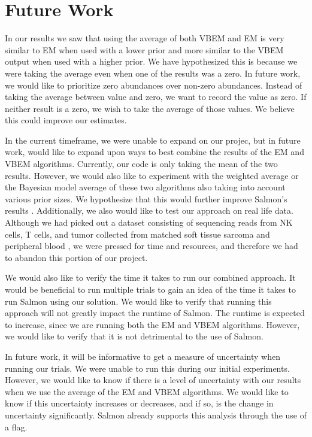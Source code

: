 \section{Future Work}
In our results we saw that using the average of both VBEM and EM is very similar to EM 
when used with a lower prior and more similar to the VBEM output when used with a higher prior. 
We have hypothesized this is because we were taking the average even when one of the results was a 
zero. In future work, we would like to prioritize zero abundances over non-zero abundances. 
Instead of taking the average between value and zero, we want to record the value as zero. 
If neither result is a zero, we wish to take the average of those values. 
We believe this could improve our estimates. 

In the current timeframe, we were unable to expand on our projec, but in future work, 
would like to expand upon ways to best combine the results of the EM and VBEM algorithms. 
Currently, our code is only taking the mean of the two results. 
However, we would also like to experiment with the weighted average or the Bayesian model average 
of these two algorithms also taking into account various prior sizes. 
We hypothesize that this would further improve Salmon’s results \cite{patro_salmon_2017}. 
Additionally, we also would like to test our approach on real life data. 
Although we had picked out a dataset consisting of sequencing reads from NK cells, T cells, 
and tumor collected from matched soft tissue sarcoma and peripheral blood \cite{judge_transcriptome_2022}, we were pressed 
for time and resources, and therefore we had to abandon this portion of our project.

We would also like to verify the time it takes to run our combined approach. 
It would be beneficial to run multiple trials to gain an idea of the time it takes to run 
Salmon using our solution. We would like to verify that running this approach will not greatly 
impact the runtime of Salmon. The runtime is expected to increase, since we are running both the 
EM and VBEM algorithms. However, we would like to verify that it is not detrimental to the use 
of Salmon. 

In future work, it will be informative to get a measure of uncertainty when running our trials. 
We were unable to run this during our initial experiments. However, we would like to know if there 
is a level of uncertainty with our results when we use the average of the EM and VBEM algorithms. 
We would like to know if this uncertainty increases or decreases, and if so, is the change in 
uncertainty significantly. Salmon already supports this analysis through the use of a flag. 
